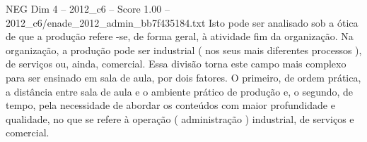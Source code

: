 \begin{textsample}{NEG Dim 4 – 2012\_c6 – Score 1.00 – 2012\_c6/enade\_2012\_admin\_bb7f435184.txt}
Isto pode ser analisado sob a ótica de que a produção refere -se, de forma geral, à atividade fim da organização.
Na organização, a produção pode ser industrial ( nos seus mais diferentes processos ), de serviços ou, ainda, comercial.
Essa divisão torna este campo mais complexo para ser ensinado em sala de aula, por dois fatores.
O primeiro, de ordem prática, a distância entre sala de aula e o ambiente prático de produção e, o segundo, de tempo, pela necessidade de abordar os conteúdos com maior profundidade e qualidade, no que se refere à operação ( administração ) industrial, de serviços e comercial.

\end{textsample}

